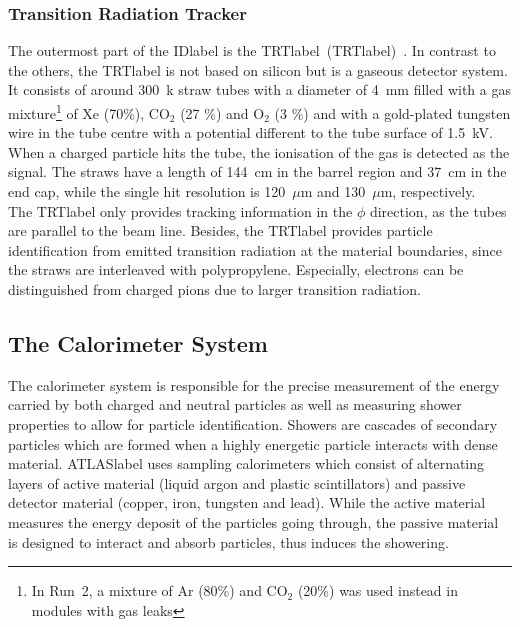 \subsubsection*{Transition Radiation Tracker}

The outermost part of the \acrshort{IDlabel} is the \acrlong{TRTlabel}~(\acrshort{TRTlabel})~\cite{MITSOU_2004,TRTRun1}. In contrast to the others, the \acrshort{TRTlabel} is not based on silicon but is a gaseous detector system. It consists of around 300~k straw tubes with a diameter of 4~mm filled with a gas mixture\footnote{In Run~2, a mixture of Ar (80\%) and CO$_2$ (20\%) was used instead in modules with gas leaks} of Xe (70\%), CO$_2$ (27 \%) and O$_2$ (3 \%) and with a gold-plated tungsten wire in the tube centre with a potential different to the tube surface of 1.5~kV. When a charged particle hits the tube, the ionisation of the gas is detected as the signal. The straws have a length of 144~cm in the barrel region and 37~cm in the end cap, while the single hit resolution is 120~$\mu$m and 130~$\mu$m, respectively.\\

The \acrshort{TRTlabel} only provides tracking information in the $\phi$ direction, as the tubes are parallel to the beam line. Besides, the \acrshort{TRTlabel} provides particle identification from emitted transition radiation at the material boundaries, since the straws are interleaved with polypropylene. Especially, electrons can be distinguished from charged pions due to larger transition radiation.


\subsection{The Calorimeter System}

The calorimeter system is responsible for the precise measurement of the energy carried by both charged and neutral particles as well as measuring shower properties to allow for particle identification. Showers are cascades of secondary particles which are formed when a highly energetic particle interacts with dense material. \acrshort{ATLASlabel} uses sampling calorimeters which consist of alternating layers of active material (liquid argon and plastic scintillators) and passive detector material (copper, iron, tungsten and lead). While the active material measures the energy deposit of the particles going through, the passive material is designed to interact and absorb particles, thus induces the showering.\\

